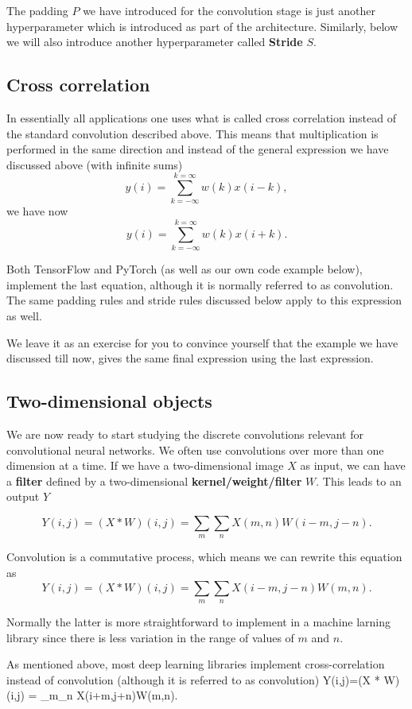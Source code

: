 \documentclass[%
oneside,                 %
final,                   %
10pt]{article}
\begin{document}
The padding $P$ we have introduced for the convolution stage is just
another hyperparameter which is introduced as part of the
architecture. Similarly, below we will also introduce another
hyperparameter called \textbf{Stride} $S$. 

\subsection{Cross correlation}

In essentially all applications one uses what is called cross correlation instead of the standard convolution described above.
This means that multiplication is performed in the same direction and instead of the general expression we have discussed above (with infinite sums)
\[
y(i) = \sum_{k=-\infty}^{k=\infty}w(k)x(i-k),
\]
we have now
\[
y(i) = \sum_{k=-\infty}^{k=\infty}w(k)x(i+k).
\]

Both TensorFlow and PyTorch (as well as our own code example below),
implement the last equation, although it is normally referred to as
convolution.  The same padding rules and stride rules discussed below
apply to this expression as well.

We leave it as an exercise for you to convince yourself that the example we have discussed till now, gives the same final expression using the last expression.

\subsection{Two-dimensional objects}

We are now ready to start studying the discrete convolutions relevant for convolutional neural networks.
We often use convolutions over more than one dimension at a time. If
we have a two-dimensional image $X$ as input, we can have a \textbf{filter}
defined by a two-dimensional \textbf{kernel/weight/filter} $W$. This leads to an output $Y$

\[
Y(i,j)=(X * W)(i,j) = \sum_m\sum_n X(m,n)W(i-m,j-n).
\]

Convolution is a commutative process, which means we can rewrite this equation as
\[
Y(i,j)=(X * W)(i,j) = \sum_m\sum_n X(i-m,j-n)W(m,n).
\]

Normally the latter is more straightforward to implement in a machine
larning library since there is less variation in the range of values
of $m$ and $n$.

As mentioned above, most deep learning libraries implement
cross-correlation instead of convolution (although it is referred to as
convolution)
Y(i,j)=(X * W)(i,j) = \sum_m\sum_n X(i+m,j+n)W(m,n).
\]
\end{document}
